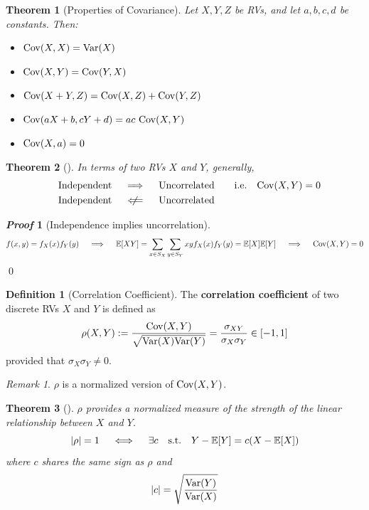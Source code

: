 \documentclass[10pt,UTF8]{article}
\newenvironment{definition box}
{\begin{tcolorbox}[colback=blue!5!white,colframe=blue!75!black,parbox=false,before upper=\par,before lower=\par]}
{\end{tcolorbox}}
\newenvironment{theorem box}
{\begin{tcolorbox}[colback=yellow!5!white,colframe=yellow!75!black,parbox=false,before upper=\par,before lower=\par]}
{\end{tcolorbox}}
\theoremstyle{definition}
\newtheorem{definition inner}{Definition}[section]
\newenvironment{definition}[1][]
{\begin{definition box}\begin{definition inner}[#1]\hfill\par}
{\end{definition inner}\end{definition box}}
\theoremstyle{plain}
\newtheorem{theorem inner}{Theorem}[section]
\newenvironment{theorem}[1][]
{\begin{theorem box}\begin{theorem inner}[#1]\hfill\par}
{\end{theorem inner}\end{theorem box}}
\theoremstyle{definition}
\newtheorem*{proof inner}{\textit{Proof}}
\renewenvironment{proof}[1][]
{\begin{proof inner}[#1]\hfill\par}
{\qed\end{proof inner}}
\theoremstyle{remark}
\newtheorem*{remark}{\textit{Remark}}
\newcommand{\E}[1]{\mathbb{E}\qty[#1]}  %
\newcommand{\Var}{\mathrm{Var}\qty}  %
\newcommand{\Cov}{\mathrm{Cov}\qty}  %
\begin{document}
\begin{theorem}[Properties of Covariance]
    Let $X,Y,Z$ be RVs, and let $a,b,c,d$ be constants. Then:
    \begin{itemize}
        \item $\Cov(X,X) = \Var(X)$
        \item $\Cov(X,Y) = \Cov(Y,X)$
        \item $\Cov(X+Y,Z) = \Cov(X,Z) + \Cov(Y,Z)$
        \item $\Cov(a X + b, c Y + d) = a c\ \Cov(X,Y)$
        \item $\Cov(X, a) = 0$
    \end{itemize}
\end{theorem}

\begin{theorem}
    In terms of two RVs $X$ and $Y$, generally,
    \begin{align*}
        \qq{Independent} &\implies \qq{Uncorrelated}\qq{i.e.}\Cov(X,Y)=0 \\
        \qq{Independent} &\centernot\impliedby \qq{Uncorrelated}
    \end{align*}
\end{theorem}
\begin{proof}[Independence implies uncorrelation]
    \begin{equation*}
        f(x,y) = f_X(x)f_Y(y) \quad\implies\quad
        \E{X Y} = \sum_{x\in S_X}\sum_{y\in S_Y} x y f_X(x)f_Y(y)
        = \E{X}\E{Y} \quad\implies\quad
        \Cov(X,Y) = 0
    \end{equation*}
\end{proof}

\begin{definition}[Correlation Coefficient]
    The \textbf{correlation coefficient} of two discrete RVs $X$ and $Y$ is defined as
    \begin{equation*}
        \rho(X,Y) := \frac{\Cov(X,Y)}{\sqrt{\Var(X)\Var(Y)}}
        = \frac{\sigma_{X Y}}{\sigma_X\sigma_Y}
        \in [-1,1]
    \end{equation*}
    provided that $\sigma_X\sigma_Y\neq 0$.
\end{definition}

\begin{remark}
    $\rho$ is a normalized  version of $\Cov(X,Y)$.
\end{remark}

\begin{theorem}
    $\rho$ provides a normalized measure of the strength of the
    linear relationship between $X$ and $Y$.
    \begin{equation*}
        \abs{\rho} = 1 \quad\iff\quad
        \exists c \qq{s.t.}
            Y - \E{Y} = c(X-\E{X})
    \end{equation*}
    where $c$ shares the same sign as $\rho$ and
    \begin{equation*}
        \abs{c} = \sqrt{\frac{\Var(Y)}{\Var(X)}}
    \end{equation*}
\end{theorem}
\end{document}
